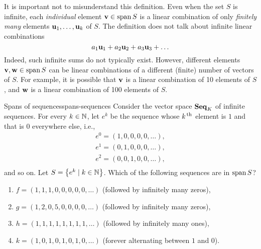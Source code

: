 It is important not to misunderstand this definition.  Even when the
set $S$ is infinite, each {\em individual} element
$\vect{v}\in\sspan S$ is a linear combination of only {\em finitely
  many} elements $\vect{u}_1,\ldots,\vect{u}_k$ of $S$.
The definition does not talk about infinite linear combinations
\begin{equation*}
  a_1\vect{u}_1 + a_2\vect{u}_2 + a_3\vect{u}_3 + \ldots
\end{equation*}
Indeed, such infinite sums do not typically exist.  However, different
elements $\vect{v},\vect{w}\in\sspan S$ can be linear combinations of
a different (finite) number of vectors of $S$. For example, it is
possible that $\vect{v}$ is a linear combination of 10 elements of
$S$, and $\vect{w}$ is a linear combination of 100 elements of $S$.

\begin{example}{Spans of sequences}{spans-sequences}
  Consider the vector space $\mathbf{Seq}_K$ of infinite sequences. For every
  $k\in\mathbb{N}$, let $e^k$ be the sequence whose $k^{\,\rm th}$ element is $1$ and
  that is $0$ everywhere else, i.e.,
  \begin{equation*}
    \begin{array}{l}
      e^0 = (1,0,0,0,0,\ldots), \\
      e^1 = (0,1,0,0,0,\ldots), \\
      e^2 = (0,0,1,0,0,\ldots), \\
    \end{array}
  \end{equation*}
  and so on.
  Let $S=\left\{e^k \mid k\in\mathbb{N}\right\}$. Which of the following sequences are in
  $\sspan S$?
  \begin{enumialphparenastyle}
    \begin{enumerate}
    \item $f = (1,1,1,0,0,0,0,0,\ldots)$ (followed by infinitely many zeros),
    \item $g = (1,2,0,5,0,0,0,0,\ldots)$ (followed by infinitely many zeros),
    \item $h = (1,1,1,1,1,1,1,1,\ldots)$ (followed by infinitely many ones),
    \item $k = (1,0,1,0,1,0,1,0,\ldots)$ (forever alternating between $1$ and $0$).
    \end{enumerate}
  \end{enumialphparenastyle}
\end{example}

